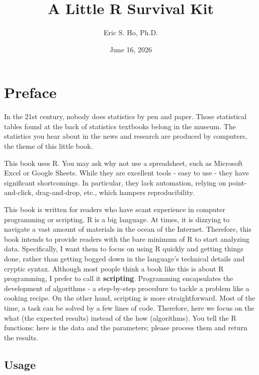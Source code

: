 \documentclass[
  letterpaper,
  DIV=11,
  numbers=noendperiod]{scrreprt}
\title{A Little R Survival Kit}
\author{Eric S. Ho, Ph.D.}
\date{June 16, 2026}
\renewcommand*\contentsname{Table of contents}
\newcommand\contentsname{Table of contents}
\begin{document}
\maketitle

\renewcommand*\contentsname{Table of contents}
{
\hypersetup{linkcolor=}
\setcounter{tocdepth}{2}
\tableofcontents
}


\chapter*{Preface}\label{preface}


In the 21st century, nobody does statistics by pen and paper. Those
statistical tables found at the back of statistics textbooks belong in
the museum. The statistics you hear about in the news and research are
produced by computers, the theme of this little book.

This book uses R. You may ask why not use a spreadsheet, such as
Microsoft Excel or Google Sheets. While they are excellent tools - easy
to use - they have significant shortcomings. In particular, they lack
automation, relying on point-and-click, drag-and-drop, etc., which
hampers reproducibility.

This book is written for readers who have scant experience in computer
programming or scripting. R is a big language. At times, it is dizzying
to navigate a vast amount of materials in the ocean of the Internet.
Therefore, this book intends to provide readers with the bare minimum of
R to start analyzing data. Specifically, I want them to focus on using R
quickly and getting things done, rather than getting bogged down in the
language's technical details and cryptic syntax. Although most people
think a book like this is about R programming, I prefer to call it
\textbf{scripting}. Programming encapsulates the development of
algorithms - a step-by-step procedure to tackle a problem like a cooking
recipe. On the other hand, scripting is more straightforward. Most of
the time, a task can be solved by a few lines of code. Therefore, here
we focus on the what (the expected results) instead of the how
(algorithms). You tell the R functions: here is the data and the
parameters; please process them and return the results.

\section*{Usage}\label{usage}
\end{document}
